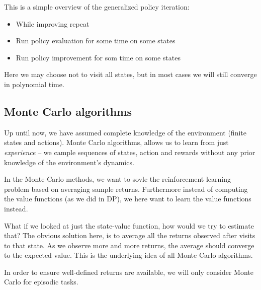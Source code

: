     This is a simple overview of the generalized policy iteration:
    \begin{itemize}
        \item While improving repeat
        \item Run policy evaluation for some time on some states
        \item Run policy improvement for som time on some states
    \end{itemize}
    Here we may choose not to visit all states, but in most cases we will still 
    converge in polynomial time.
    
    \subsection{Monte Carlo algorithms}
    Up until now, we have assumed complete knowledge of the environment (finite 
    states and actions). Monte Carlo algorithms, allows us to learn from just 
    \textit{experience} -- we cample sequences of states, action and rewards 
    without any prior knowledge of the environment's dynamics.
    
    In the Monte Carlo methods, we want to sovle the reinforcement learning 
    problem based on averaging sample returns. Furthermore instead of computing 
    the value functions (as we did in DP), we here want to learn the value 
    functions instead.
    
    What if we looked at just the state-value function, how would we try to 
    estimate that? The obvious solution here, is to average all the returns 
    observed after visits to that state. As we observe more and more returns, 
    the average should converge to the expected value. This is the underlying 
    idea of all Monte Carlo algorithms.
    
    In order to ensure well-defined returns are available, we will only 
    consider Monte Carlo for episodic tasks.
    
